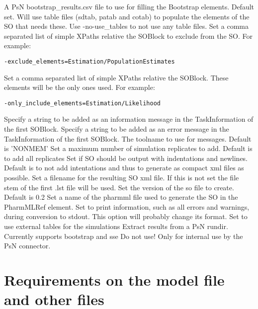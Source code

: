 \begin{optionlist}
A PsN bootstrap\_results.csv file to use for filling the Bootstrap elements.
\nextopt
{}
Default set. Will use table files (sdtab, patab and cotab) to populate the elements of the SO that needs these. Use -no-use\_tables to not use any table files.
\nextopt
{}
Set a comma separated list of simple XPaths relative the SOBlock to exclude from the SO.
For example:
\begin{verbatim}
-exclude_elements=Estimation/PopulationEstimates
\end{verbatim}
\nextopt
{}
Set a comma separated list of simple XPaths relative the SOBlock. These elements will be the only ones used.
For example: 
\begin{verbatim}
-only_include_elements=Estimation/Likelihood
\end{verbatim}
\nextopt
{}
Specify a string to be added as an information message in the TaskInformation of the first SOBlock.
\nextopt
{}
Specify a string to be added as an error message in the TaskInformation of the first SOBlock.
\nextopt
{}
The toolname to use for messages. Default is 'NONMEM'
\nextopt
{}
Set a maximum number of simulation replicates to add. Default is to add all replicates
\nextopt
{}
Set if SO should be output with indentations and newlines.
Default is to not add intentations and thus to generate as compact xml files as possible.
\nextopt
{}
Set a filename for the resulting SO xml file. If this is not set the file stem of the first .lst file will be used.
\nextopt
{}
Set the version of the so file to create. Default is 0.2
\nextopt
{}
Set a name of the pharmml file used to generate the SO
in the PharmMLRef element.
\nextopt
{}
Set to print information, such as all errors and warnings, during conversion to stdout.
\nextopt
{}
This option will probably change its format.
Set to use external tables for the simulations
\nextopt
{}
Extract results from a PsN rundir. Currently supports bootstrap and sse
\nextopt
{}
Do not use! Only for internal use by the PsN connector.
\nextopt
\end{optionlist}

\section{Requirements on the model file and other files}

